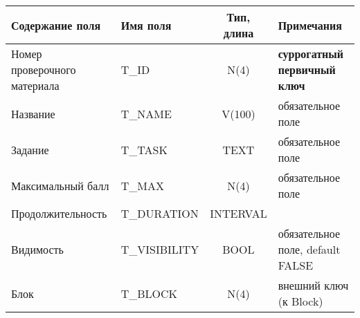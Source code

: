 \documentclass[a4paper,14pt]{article}
\begin{document}

\begin{table}[H]
	\begin{flushleft} 
	\end{flushleft}
	\begin{adjustbox}{width=\linewidth}
		\begin{tabular}{|l|l|c|l|}
			\hline
			Содержание поля              & Имя поля     & Тип, длина & Примечания                          \\ \hline
			Номер проверочного материала & T\_ID         &    N(4)    & \textbf{суррогатный первичный ключ} \\ \hline
			Название                     & T\_NAME       &   V(100)   & обязательное поле                   \\ \hline
			Задание                      & T\_TASK       &    TEXT    & обязательное поле                   \\ \hline
			Максимальный балл            & T\_MAX        &    N(4)    & обязательное поле                   \\ \hline
			Продолжительность            & T\_DURATION   &  INTERVAL  &                                     \\ \hline
			Видимость                    & T\_VISIBILITY &    BOOL    & обязательное поле, default FALSE    \\ \hline
			Блок                         & T\_BLOCK      &    N(4)    & внешний ключ (к Block)              \\ \hline
		\end{tabular}
	\end{adjustbox}
\end{table}

\end{document}
